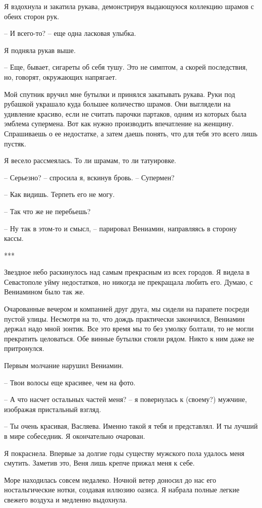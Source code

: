 \documentclass[
]{book}
\begin{document}
Я вздохнула и закатила рукава, демонстрируя выдающуюся коллекцию шрамов с обеих сторон рук.

-- И всего-то? -- еще одна ласковая улыбка.

Я подняла рукав выше.

-- Еще, бывает, сигареты об себя тушу. Это не симптом, а скорей последствия, но, говорят, окружающих напрягает.

Мой спутник вручил мне бутылки и принялся закатывать рукава. Руки под рубашкой украшало куда большее количество шрамов. Они выглядели на удивление красиво, если не считать парочки партаков, одним из которых была эмблема супермена. Вот как нужно производить впечатление на женщину. Спрашиваешь о ее недостатке, а затем даешь понять, что для тебя это всего лишь пустяк.

Я весело рассмеялась. То ли шрамам, то ли татуировке.

-- Серьезно? -- спросила я, вскинув бровь. -- Супермен?

-- Как видишь. Терпеть его не могу.

-- Так что же не перебьешь?

-- Ну так в этом-то и смысл, -- парировал Вениамин, направляясь в сторону кассы.

***

Звездное небо раскинулось над самым прекрасным из всех городов. Я видела в Севастополе уйму недостатков, но никогда не прекращала любить его. Думаю, с Вениамином было так же.

Очарованные вечером и компанией друг друга, мы сидели на парапете посреди пустой улицы. Несмотря на то, что дождь практически закончился, Вениамин держал надо мной зонтик. Все это время мы то без умолку болтали, то не могли прекратить целоваться. Обе винные бутылки стояли рядом. Никто к ним даже не притронулся.

Первым молчание нарушил Вениамин.

-- Твои волосы еще красивее, чем на фото.

-- А что насчет остальных частей меня? -- я повернулась к (своему?) мужчине, изображая пристальный взгляд.

-- Ты очень красивая, Васляева. Именно такой я тебя и представлял. И ты лучший в мире собеседник. Я окончательно очарован.

Я покраснела. Впервые за долгие годы существу мужского пола удалось меня смутить. Заметив это, Веня лишь крепче прижал меня к себе.

Море находилась совсем недалеко. Ночной ветер доносил до нас его ностальгические нотки, создавая иллюзию оазиса. Я набрала полные легкие свежего воздуха и медленно выдохнула.
\end{document}
